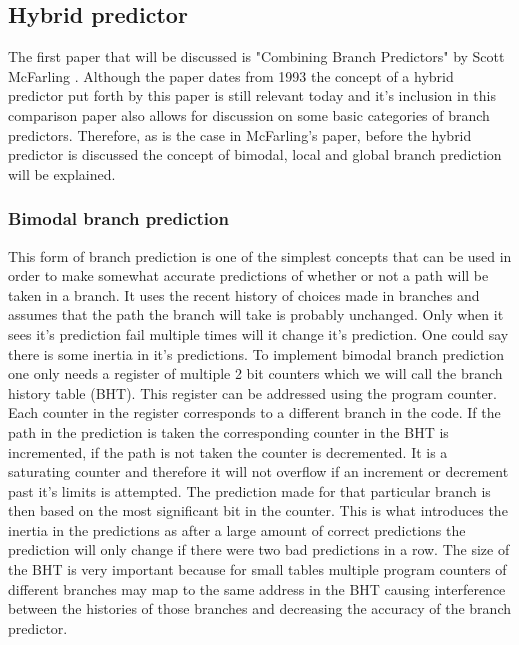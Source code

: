 \subsection{Hybrid predictor}
The first paper that will be discussed is "Combining Branch Predictors" by Scott McFarling \cite{hybrid}. Although the paper dates from 1993 the concept of a hybrid predictor put forth by this paper is still relevant today and it's inclusion in this comparison paper also allows for discussion on some basic categories of branch predictors. Therefore, as is the case in McFarling's paper, before the hybrid predictor is discussed the concept of bimodal, local and global branch prediction will be explained.
\subsubsection{Bimodal branch prediction}
This form of branch prediction is one of the simplest concepts that can be used in order to make somewhat accurate predictions of whether or not a path will be taken in a branch. It uses the recent history of choices made in branches and assumes that the path the branch will take is probably unchanged. Only when it sees it's prediction fail multiple times will it change it's prediction. One could say there is some inertia in it's predictions. To implement bimodal branch prediction one only needs a register of multiple 2 bit counters which we will call the branch history table (BHT). This register can be addressed using the program counter. Each counter in the register corresponds to a different branch in the code. If the path in the prediction is taken the corresponding counter in the BHT is incremented, if the path is not taken the counter is decremented. It is a saturating counter and therefore it will not overflow if an increment or decrement past it's limits is attempted. The prediction made for that particular branch is then based on the most significant bit in the counter. This is what introduces the inertia in the predictions as after a large amount of correct predictions the prediction will only change if there were two bad predictions in a row. The size of the BHT is very important because for small tables multiple program counters of different branches may map to the same address in the BHT causing interference between the histories of those branches and decreasing the accuracy of the branch predictor.
